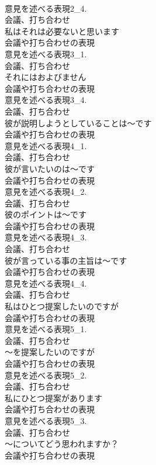 \documentclass[8pt]{extreport}
\begin{document}
\begin{CJK}{UTF8}{min}
\\	意見を述べる表現2_4.
\\	会議、打ち合わせ
\\	私はそれは必要ないと思います	
\\	会議や打ち合わせの表現
\\	意見を述べる表現3_1.
\\	会議、打ち合わせ
\\	それにはおよびません	
\\	会議や打ち合わせの表現
\\	意見を述べる表現3_4.
\\	会議、打ち合わせ
\\	彼が説明しようとしていることは～です	
\\	会議や打ち合わせの表現
\\	意見を述べる表現4_1.
\\	会議、打ち合わせ
\\	彼が言いたいのは～です	
\\	会議や打ち合わせの表現
\\	意見を述べる表現4_2.
\\	会議、打ち合わせ
\\	彼のポイントは～です	
\\	会議や打ち合わせの表現
\\	意見を述べる表現4_3.
\\	会議、打ち合わせ
\\	彼が言っている事の主旨は～です	
\\	会議や打ち合わせの表現
\\	意見を述べる表現4_4.
\\	会議、打ち合わせ
\\	私はひとつ提案したいのですが	
\\	会議や打ち合わせの表現
\\	意見を述べる表現5_1.
\\	会議、打ち合わせ
\\	～を提案したいのですが	
\\	会議や打ち合わせの表現
\\	意見を述べる表現5_2.
\\	会議、打ち合わせ
\\	私にひとつ提案があります	
\\	会議や打ち合わせの表現
\\	意見を述べる表現5_3.
\\	会議、打ち合わせ
\\	～についてどう思われますか？	
\\	会議や打ち合わせの表現

\end{CJK}
\end{document}
